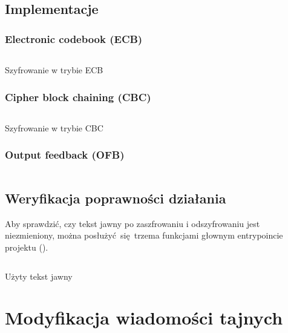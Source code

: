 \documentclass[12pt]{article}
\begin{document}
\subsection{Implementacje}

\subsubsection{Electronic codebook (ECB)}

\begin{listing}[H]
	\inputminted[firstline=113,lastline=133]{python}{../aes.py}
	\caption{Szyfrowanie w trybie ECB}
\end{listing}

\subsubsection{Cipher block chaining (CBC)}

\begin{listing}[H]
	\inputminted[firstline=135,lastline=162]{python}{../aes.py}
	\caption{Szyfrowanie w trybie CBC}
\end{listing}

\subsubsection{Output feedback (OFB)}

\begin{listing}[H]
	\inputminted[firstline=164,lastline=185]{python}{../aes.py}
\end{listing}

\subsection{Weryfikacja poprawności działania}

Aby sprawdzić, czy tekst jawny po zaszfrowaniu i odszyfrowaniu jest niezmieniony,
można posłużyć się trzema funkcjami głownym entrypoincie
projektu (\textit{}).

\begin{listing}[H]
	\inputminted[firstline=12,lastline=15]{python}{../aes_tests.py}
	\caption{Użyty tekst jawny}
\end{listing}

\section{Modyfikacja wiadomości tajnych}
\end{document}
